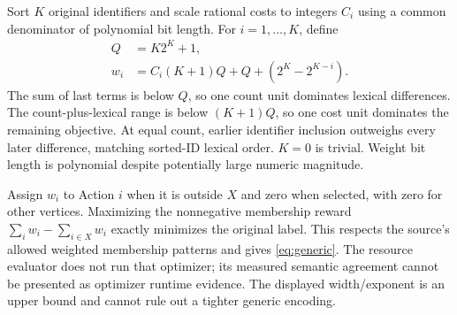 Sort $K$ original identifiers and scale rational costs to integers $C_i$ using a common denominator of polynomial bit length. For $i=1,\ldots,K$, define
\begin{align}
Q&=K2^K+1,\\
w_i&=C_i(K+1)Q+Q+(2^K-2^{K-i}).
\end{align}
The sum of last terms is below $Q$, so one count unit dominates lexical differences. The count-plus-lexical range is below $(K+1)Q$, so one cost unit dominates the remaining objective. At equal count, earlier identifier inclusion outweighs every later difference, matching sorted-ID lexical order. $K=0$ is trivial. Weight bit length is polynomial despite potentially large numeric magnitude.

Assign $w_i$ to Action $i$ when it is outside $X$ and zero when selected, with zero for other vertices. Maximizing the nonnegative membership reward $\sum_iw_i-\sum_{i\in X}w_i$ exactly minimizes the original label. This respects the source's allowed weighted membership patterns and gives \eqref{eq:generic}. The resource evaluator does not run that optimizer; its measured semantic agreement cannot be presented as optimizer runtime evidence. The displayed width/exponent is an upper bound and cannot rule out a tighter generic encoding.
